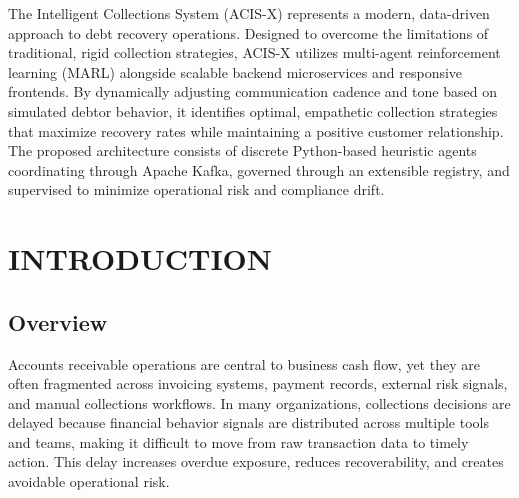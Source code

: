 \documentclass[a4paper, 12pt]{report}
\makeatletter
\let\ps@plainorig\ps@plain
\let\ps@plain\ps@titlepagelayout
\makeatother
\begin{document}
\doublespacing
The Intelligent Collections System (ACIS-X) represents a modern, data-driven approach to debt recovery operations. Designed to overcome the limitations of traditional, rigid collection strategies, ACIS-X utilizes multi-agent reinforcement learning (MARL) alongside scalable backend microservices and responsive frontends. By dynamically adjusting communication cadence and tone based on simulated debtor behavior, it identifies optimal, empathetic collection strategies that maximize recovery rates while maintaining a positive customer relationship. The proposed architecture consists of discrete Python-based heuristic agents coordinating through Apache Kafka, governed through an extensible registry, and supervised to minimize operational risk and compliance drift.

\newpage

\pagestyle{borderedpage}

\renewcommand{\contentsname}{\centering \large{\textbf{CONTENTS}}}
\newpage


\tableofcontents
\thispagestyle{titlepagelayout}
\newpage


{
\makeatletter
\renewcommand*{\addvspace}[1]{}
\makeatother
{}
\doublespacing
\listoffigures
\thispagestyle{titlepagelayout}
\newpage
\doublespacing
\listoftables
\thispagestyle{titlepagelayout}
\restoregeometry
\newpage
}

\setcounter{page}{1}

\makeatletter
\let\ps@plain\ps@plainorig
\makeatother

\pagestyle{plain}

\titlespacing*{\chapter}{0pt}{-30pt}{5pt}
\setlength{\parindent}{32pt}

\chapter{INTRODUCTION}
\thispagestyle{chapterfirstpage}


\section{Overview}
Accounts receivable operations are central to business cash flow, yet they are often fragmented across invoicing systems, payment records, external risk signals, and manual collections workflows. In many organizations, collections decisions are delayed because financial behavior signals are distributed across multiple tools and teams, making it difficult to move from raw transaction data to timely action. This delay increases overdue exposure, reduces recoverability, and creates avoidable operational risk.
\end{document}
